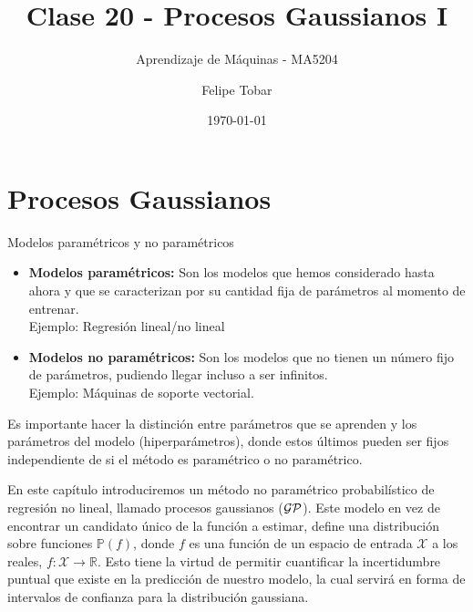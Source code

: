 \documentclass[9pt]{beamer}
\title{Clase 20 - Procesos Gaussianos I}
\subtitle{Aprendizaje de Máquinas - MA5204}
\date{\today}
\author{Felipe Tobar}
\institute{Department of Mathematical Engineering \&\\ Center for Mathematical Modelling\\Universidad de Chile}
\begin{document}
\begin{frame}
  \titlepage
\end{frame}

\section{Procesos Gaussianos}

\begin{frame}{Modelos paramétricos y no paramétricos}
\begin{itemize}
  \item \textbf{Modelos paramétricos: } Son los modelos que hemos considerado hasta ahora y que se caracterizan por su cantidad fija de parámetros al momento de entrenar. \\ \pause 
  Ejemplo: Regresión lineal/no lineal \pause 
  \item \textbf{Modelos no paramétricos: } Son los modelos que no tienen un número fijo de parámetros, pudiendo llegar incluso a ser infinitos. \\ \pause 
  Ejemplo: Máquinas de soporte vectorial. \pause 

\end{itemize}

\begin{observacion}
Es importante hacer la distinción entre parámetros que se aprenden y los parámetros del modelo (hiperparámetros), donde estos últimos pueden ser fijos independiente de si el método es paramétrico o no paramétrico.
\end{observacion} \pause 

En este capítulo introduciremos un método no paramétrico probabilístico de regresión no lineal, llamado procesos gaussianos ($\mathcal{GP}$). Este modelo en vez de encontrar un candidato único de la función a estimar, define una distribución sobre funciones $\mathbb{P}(f)$, donde $f$ es una función de un espacio de entrada $\mathcal{X}$ a los reales, $f: \mathcal{X} \rightarrow \mathbb{R}$. Esto tiene la virtud de permitir cuantificar la incertidumbre puntual que existe en la predicción de nuestro modelo, la cual servirá en forma de intervalos de confianza para la distribución gaussiana.

\end{frame}
\end{document}
